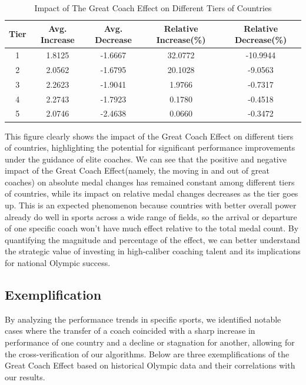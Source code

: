 \documentclass{mcmthesis}
\begin{document}
\begin{table}[htbp]
    \centering
    \begin{tabular}{|c|c|c|c|c|}
        \hline
        Tier & Avg. Increase & Avg. Decrease & Relative Increase(\%) & Relative Decrease(\%) \\
        \hline
        1 & 1.8125 & -1.6667 & 32.0772 & -10.9944 \\
        \hline
        2 & 2.0562 & -1.6795 & 20.1028 & -9.0563 \\
        \hline
        3 & 2.2623 & -1.9041 & 1.9766 & -0.7317 \\
        \hline
        4 & 2.2743 & -1.7923 & 0.1780 & -0.4518 \\
        \hline
        5 & 2.0746 & -2.4638 & 0.0660 & -0.3472 \\
        \hline
    \end{tabular}
    \caption{Impact of The Great Coach Effect on Different Tiers of Countries}
\end{table}

This figure clearly shows the impact of the Great Coach Effect on different tiers of countries, highlighting the potential for significant performance improvements under the guidance of elite coaches. We can see that the positive and negative impact of the Great Coach Effect(namely, the moving in and out of great coaches) on absolute medal changes has remained constant among different tiers of countries, while its impact on relative medal changes decreases as the tier goes up. This is an expected phenomenon because countries with better overall power already do well in sports across a wide range of fields, so the arrival or departure of one specific coach won't have much effect relative to the total medal count. By quantifying the magnitude and percentage of the effect, we can better understand the strategic value of investing in high-caliber coaching talent and its implications for national Olympic success.

\subsection{Exemplification}
By analyzing the performance trends in specific sports, we identified notable cases where the transfer of a coach coincided with a sharp increase in performance of one country and a decline or stagnation for another, allowing for the cross-verification of our algorithms. Below are three exemplifications of the Great Coach Effect based on historical Olympic data and their correlations with our results.\
\end{document}
